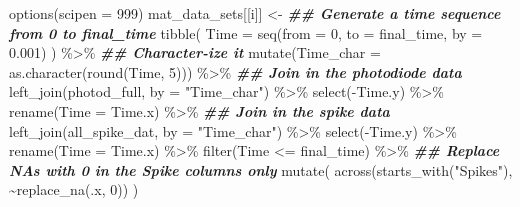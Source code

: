 \documentclass[
]{book}
\newenvironment{Shaded}{\begin{snugshade}}{\end{snugshade}}
\newcommand{\AttributeTok}[1]{\textcolor[rgb]{0.77,0.63,0.00}{#1}}
\newcommand{\DecValTok}[1]{\textcolor[rgb]{0.00,0.00,0.81}{#1}}
\newcommand{\DocumentationTok}[1]{\textcolor[rgb]{0.56,0.35,0.01}{\textbf{\textit{#1}}}}
\newcommand{\FloatTok}[1]{\textcolor[rgb]{0.00,0.00,0.81}{#1}}
\newcommand{\FunctionTok}[1]{\textcolor[rgb]{0.00,0.00,0.00}{#1}}
\newcommand{\NormalTok}[1]{#1}
\newcommand{\OtherTok}[1]{\textcolor[rgb]{0.56,0.35,0.01}{#1}}
\newcommand{\SpecialCharTok}[1]{\textcolor[rgb]{0.00,0.00,0.00}{#1}}
\newcommand{\StringTok}[1]{\textcolor[rgb]{0.31,0.60,0.02}{#1}}
\begin{document}
\begin{Shaded}
\begin{Highlighting}[]
  \FunctionTok{options}\NormalTok{(}\AttributeTok{scipen =} \DecValTok{999}\NormalTok{)}
\NormalTok{  mat\_data\_sets[[i]] }\OtherTok{\textless{}{-}}
    \DocumentationTok{\#\# Generate a time sequence from 0 to final\_time}
    \FunctionTok{tibble}\NormalTok{(}
      \AttributeTok{Time =} \FunctionTok{seq}\NormalTok{(}\AttributeTok{from =} \DecValTok{0}\NormalTok{, }\AttributeTok{to =}\NormalTok{ final\_time, }\AttributeTok{by =} \FloatTok{0.001}\NormalTok{)}
\NormalTok{    ) }\SpecialCharTok{\%\textgreater{}\%}
    \DocumentationTok{\#\# Character{-}ize it}
    \FunctionTok{mutate}\NormalTok{(}\AttributeTok{Time\_char =} \FunctionTok{as.character}\NormalTok{(}\FunctionTok{round}\NormalTok{(Time, }\DecValTok{5}\NormalTok{))) }\SpecialCharTok{\%\textgreater{}\%}
    \DocumentationTok{\#\# Join in the photodiode data}
    \FunctionTok{left\_join}\NormalTok{(photod\_full, }\AttributeTok{by =} \StringTok{"Time\_char"}\NormalTok{) }\SpecialCharTok{\%\textgreater{}\%}
    \FunctionTok{select}\NormalTok{(}\SpecialCharTok{{-}}\NormalTok{Time.y) }\SpecialCharTok{\%\textgreater{}\%}
    \FunctionTok{rename}\NormalTok{(}\AttributeTok{Time =}\NormalTok{ Time.x) }\SpecialCharTok{\%\textgreater{}\%}
    \DocumentationTok{\#\# Join in the spike data}
    \FunctionTok{left\_join}\NormalTok{(all\_spike\_dat, }\AttributeTok{by =} \StringTok{"Time\_char"}\NormalTok{) }\SpecialCharTok{\%\textgreater{}\%}
    \FunctionTok{select}\NormalTok{(}\SpecialCharTok{{-}}\NormalTok{Time.y) }\SpecialCharTok{\%\textgreater{}\%}
    \FunctionTok{rename}\NormalTok{(}\AttributeTok{Time =}\NormalTok{ Time.x) }\SpecialCharTok{\%\textgreater{}\%}
    \FunctionTok{filter}\NormalTok{(Time }\SpecialCharTok{\textless{}=}\NormalTok{ final\_time) }\SpecialCharTok{\%\textgreater{}\%}
    \DocumentationTok{\#\# Replace NAs with 0 in the Spike columns only}
    \FunctionTok{mutate}\NormalTok{(}
      \FunctionTok{across}\NormalTok{(}\FunctionTok{starts\_with}\NormalTok{(}\StringTok{"Spikes"}\NormalTok{), }\SpecialCharTok{\textasciitilde{}}\FunctionTok{replace\_na}\NormalTok{(.x, }\DecValTok{0}\NormalTok{))}
\NormalTok{    )}


\end{Highlighting}
\end{Shaded}
\end{document}
